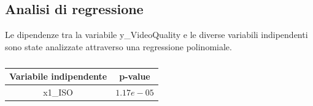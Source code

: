 \subsection{Analisi di regressione}

Le dipendenze tra la variabile y\_VideoQuality e le diverse variabili indipendenti sono state analizzate attraverso una regressione polinomiale.

\begin{table}[H]
	\centering
	\begin{tabular}{|c|c|}
		\hline
		\textbf{Variabile indipendente} & \textbf{p-value} \\
		\hline
		x1\_ISO & $1.17e-05$ \\
		\hline
	\end{tabular}
	\caption{}
	\label{tab:}
\end{table}





